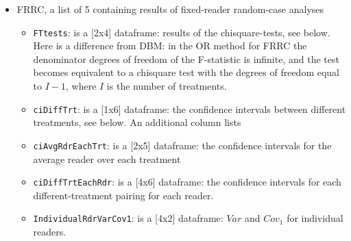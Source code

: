 \documentclass[
]{book}
\newenvironment{Shaded}{\begin{snugshade}}{\end{snugshade}}
\newcommand{\CommentTok}[1]{\textcolor[rgb]{0.56,0.35,0.01}{\textit{#1}}}
\newcommand{\NormalTok}[1]{#1}
\newcommand{\OperatorTok}[1]{\textcolor[rgb]{0.81,0.36,0.00}{\textbf{#1}}}
\providecommand{\tightlist}{%
  \setlength{\itemsep}{0pt}\setlength{\parskip}{0pt}}
\begin{document}
\begin{Shaded}
\end{Shaded}

\begin{itemize}
\tightlist
\item
  FRRC, a list of 5 containing results of fixed-reader random-case analyses

  \begin{itemize}
  \tightlist
  \item
    \texttt{FTtests}: is a {[}2x4{]} dataframe: results of the chisquare-tests, see below. Here is a difference from DBM: in the OR method for FRRC the denominator degrees of freedom of the F-statistic is infinite, and the test becomes equivalent to a chisquare test with the degrees of freedom equal to \(I-1\), where \(I\) is the number of treatments.
  \item
    \texttt{ciDiffTrt}: is a {[}1x6{]} dataframe: the confidence intervals between different treatments, see below. An additional column lists
  \item
    \texttt{ciAvgRdrEachTrt}: is a {[}2x5{]} dataframe: the confidence intervals for the average reader over each treatment
  \item
    \texttt{ciDiffTrtEachRdr}: is a {[}4x6{]} dataframe: the confidence intervals for each different-treatment pairing for each reader.
  \item
    \texttt{IndividualRdrVarCov1}: is a {[}4x2{]} dataframe: \(Var\) and \(Cov_1\) for individual readers.
  \end{itemize}
\end{itemize}
\end{document}
